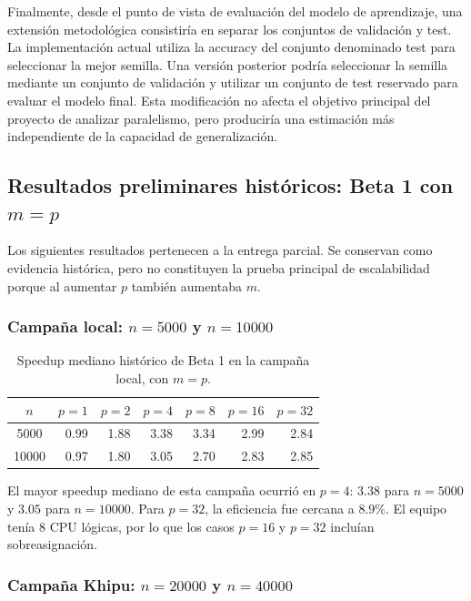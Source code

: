 \documentclass[11pt,a4paper]{article}
\begin{document}
Finalmente, desde el punto de vista de evaluación del modelo de aprendizaje, una
extensión metodológica consistiría en separar los conjuntos de validación y test.
La implementación actual utiliza la accuracy del conjunto denominado test para
seleccionar la mejor semilla. Una versión posterior podría seleccionar la semilla
mediante un conjunto de validación y utilizar un conjunto de test reservado
para evaluar el modelo final. Esta modificación no afecta el objetivo principal del
proyecto de analizar paralelismo, pero produciría una estimación más independiente de
la capacidad de generalización.

\subsection{Resultados preliminares históricos: Beta 1 con $m=p$}

Los siguientes resultados pertenecen a la entrega parcial. Se conservan como evidencia
histórica, pero no constituyen la prueba principal de escalabilidad porque al aumentar
$p$ también aumentaba $m$.

\subsubsection{Campaña local: $n=5000$ y $n=10000$}

\begin{table}[H]
\centering
\small
\begin{tabular}{c r r r r r r}
\toprule
$n$ & $p=1$ & $p=2$ & $p=4$ & $p=8$ & $p=16$ & $p=32$ \\
\midrule
5000  & 0.99 & 1.88 & 3.38 & 3.34 & 2.99 & 2.84 \\
10000 & 0.97 & 1.80 & 3.05 & 2.70 & 2.83 & 2.85 \\
\bottomrule
\end{tabular}
\caption{Speedup mediano histórico de Beta 1 en la campaña local, con $m=p$.}
\label{tab:speedup-local-historico}
\end{table}

El mayor speedup mediano de esta campaña ocurrió en $p=4$: $3.38$ para $n=5000$ y
$3.05$ para $n=10000$. Para $p=32$, la eficiencia fue cercana a $8.9\%$. El equipo
tenía 8 CPU lógicas, por lo que los casos $p=16$ y $p=32$ incluían sobreasignación.

\subsubsection{Campaña Khipu: $n=20000$ y $n=40000$}
\end{document}
